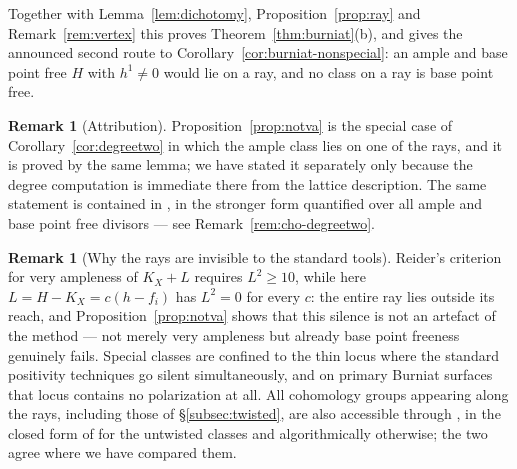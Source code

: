 \documentclass{amsart}
\theoremstyle{definition}
\newtheorem{remark}[theorem]{Remark}
\begin{document}
Together with Lemma~\ref{lem:dichotomy}, Proposition~\ref{prop:ray} and Remark~\ref{rem:vertex} this proves Theorem~\ref{thm:burniat}(b), and gives the announced second route to Corollary~\ref{cor:burniat-nonspecial}: an ample and base point free $H$ with $h^1\neq0$ would lie on a ray, and no class on a ray is base point free.

\begin{remark}[Attribution]\label{rem:cho-notva}
Proposition~\ref{prop:notva} is the special case of Corollary~\ref{cor:degreetwo} in which the ample class lies on one of the rays, and it is proved by the same lemma; we have stated it separately only because the degree computation is immediate there from the lattice description. The same statement is contained in \cite[Prop.~5.4]{Cho26}, in the stronger form quantified over all ample and base point free divisors --- see Remark~\ref{rem:cho-degreetwo}.
\end{remark}

\begin{remark}[Why the rays are invisible to the standard tools]\label{rem:reider-silent}
Reider's criterion for very ampleness of $K_X+L$ requires $L^2\ge10$, while here $L=H-K_X=c(h-f_i)$ has $L^2=0$ for every $c$: the entire ray lies outside its reach, and Proposition~\ref{prop:notva} shows that this silence is not an artefact of the method --- not merely very ampleness but already base point freeness genuinely fails. Special classes are confined to the thin locus where the standard positivity techniques go silent simultaneously, and on primary Burniat surfaces that locus contains no polarization at all. All cohomology groups appearing along the rays, including those of \S\ref{subsec:twisted}, are also accessible through \cite{Cho26}, in the closed form of \cite[Prop.~4.27]{Cho26} for the untwisted classes and algorithmically otherwise; the two agree where we have compared them.
\end{remark}
\end{document}
